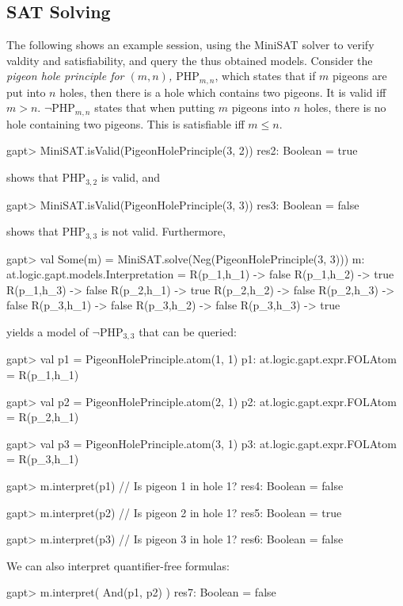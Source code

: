 \documentclass[a4paper,11pt]{article}
\begin{document}
\subsection{SAT Solving}
%
The following shows an example session, using the MiniSAT solver
to verify valdity and satisfiability, and query the thus obtained models.
Consider the {\em pigeon hole principle for $(m, n)$, $\mathrm{PHP}_{m,n}$}, which states that if $m$ pigeons
are put into $n$ holes, then there is a hole which contains two pigeons. It is valid
iff $m>n$. $\neg\mathrm{PHP}_{m,n}$ states that when putting $m$ pigeons into $n$ holes, there
is no hole containing two pigeons. This is satisfiable iff $m\leq n$.
\begin{clilisting}
gapt> MiniSAT.isValid(PigeonHolePrinciple(3, 2))
res2: Boolean = true

\end{clilisting}
shows that $\mathrm{PHP}_{3,2}$ is valid, and
\begin{clilisting}
gapt> MiniSAT.isValid(PigeonHolePrinciple(3, 3))
res3: Boolean = false

\end{clilisting}
shows that $\mathrm{PHP}_{3,3}$ is not valid.
Furthermore,
\begin{clilisting}
gapt> val Some(m) = MiniSAT.solve(Neg(PigeonHolePrinciple(3, 3)))
m: at.logic.gapt.models.Interpretation =
R(p_1,h_1) -> false
R(p_1,h_2) -> true
R(p_1,h_3) -> false
R(p_2,h_1) -> true
R(p_2,h_2) -> false
R(p_2,h_3) -> false
R(p_3,h_1) -> false
R(p_3,h_2) -> false
R(p_3,h_3) -> true

\end{clilisting}
yields a model of $\neg\mathrm{PHP}_{3,3}$ that can be queried:
\begin{clilisting}
gapt> val p1 = PigeonHolePrinciple.atom(1, 1)
p1: at.logic.gapt.expr.FOLAtom = R(p_1,h_1)

gapt> val p2 = PigeonHolePrinciple.atom(2, 1)
p2: at.logic.gapt.expr.FOLAtom = R(p_2,h_1)

gapt> val p3 = PigeonHolePrinciple.atom(3, 1)
p3: at.logic.gapt.expr.FOLAtom = R(p_3,h_1)

gapt> m.interpret(p1) // Is pigeon 1 in hole 1?
res4: Boolean = false

gapt> m.interpret(p2) // Is pigeon 2 in hole 1?
res5: Boolean = true

gapt> m.interpret(p3) // Is pigeon 3 in hole 1?
res6: Boolean = false

\end{clilisting}
We can also interpret quantifier-free formulas:
\begin{clilisting}
gapt> m.interpret( And(p1, p2) )
res7: Boolean = false

\end{clilisting}
\end{document}
